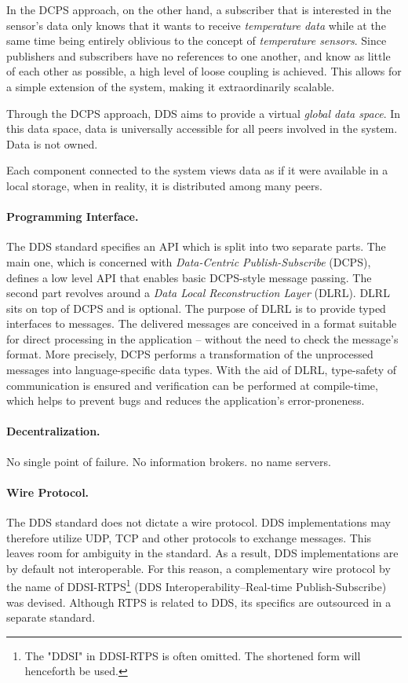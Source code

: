 In the DCPS approach, on the other hand, a subscriber that is interested in the sensor's data only knows that it wants to receive \emph{temperature data} while at the same time being entirely oblivious to the concept of \emph{temperature sensors}. 
Since publishers and subscribers have no references to one another, and know as little of each other as possible, a high level of loose coupling is achieved. This allows for a simple extension of the system, making it extraordinarily scalable.

Through the DCPS approach, DDS aims to provide a virtual \emph{global data space}. In this data space, data is universally accessible for all peers involved in the system. Data is not owned. 

Each component connected to the system views data as if it were available in a local storage, when in reality, it is distributed among many peers.


\paragraph{Programming Interface.}
The DDS standard specifies an API which is split into two separate parts. The main one, which is concerned with \emph{Data-Centric Publish-Subscribe} (DCPS), defines a low level API that enables basic DCPS-style message passing. The second part revolves around a \emph{Data Local Reconstruction Layer} (DLRL). DLRL sits on top of DCPS and is optional. The purpose of DLRL is to provide typed interfaces to messages. The delivered messages are conceived in a format suitable for direct processing in the application -- without the need to check the message's format. More precisely, DCPS performs a transformation of the unprocessed messages into language-specific data types. With the aid of DLRL, type-safety of communication is ensured and verification can be performed at compile-time, which helps to prevent bugs and reduces the application's error-proneness.


\paragraph{Decentralization.}
No single point of failure. No information brokers. no name servers.

\paragraph{Wire Protocol.}
The DDS standard does not dictate a wire protocol. DDS implementations may therefore utilize UDP, TCP and other protocols to exchange messages. This leaves room for ambiguity in the standard. As a result, DDS implementations are by default not interoperable. For this reason, a complementary wire protocol by the name of DDSI-RTPS\footnote{The "DDSI" in DDSI-RTPS is often omitted. The shortened form will henceforth be used.} (DDS Interoperability--Real-time Publish-Subscribe) was devised. Although RTPS is related to DDS, its specifics are outsourced in a separate standard. \cite{rtps-2.2-standard}

